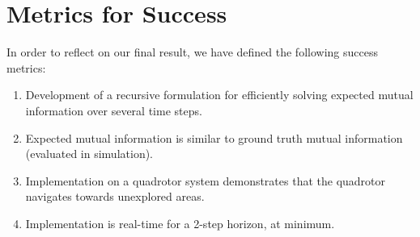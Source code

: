 \section{Metrics for Success}

In order to reflect on our final result, we have defined the following success metrics:

\begin{enumerate}
  \item Development of a recursive formulation for efficiently solving expected mutual information over several time steps.
  \item Expected mutual information is similar to ground truth mutual information (evaluated in simulation).
  \item Implementation on a quadrotor system demonstrates that the quadrotor navigates towards unexplored areas.
  \item Implementation is real-time for a 2-step horizon, at minimum.
\end{enumerate}
